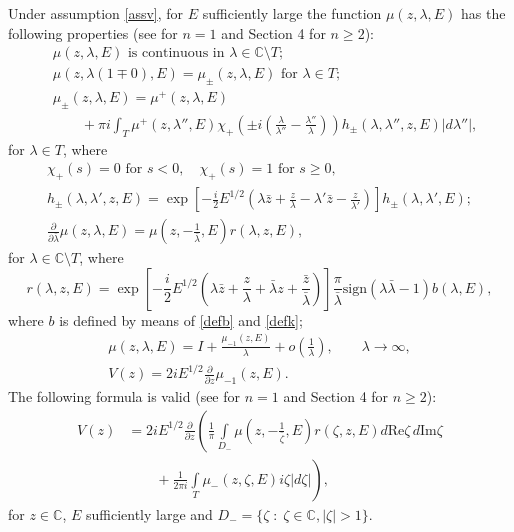 \documentclass[11pt,a4paper,english,subeqn]{amsart}
\theoremstyle{plain}
\theoremstyle{definition}
\numberwithin{equation}{section}
\begin{document}
Under assumption \eqref{assv}, for $E$ sufficiently large the function $\mu(z,\lambda, E)$ has the following properties (see \cite{N3, N4} for $n=1$ and Section 4 for $n \geq 2$):
\begin{align} \label{propmu0}
&\mu(z,\lambda,E) \text{ is continuous in } \lambda \in {\mathbb{C}} \setminus T; \\ \label{propmu1}
&\mu(z,\lambda(1\mp 0), E) = \mu_{\pm}(z,\lambda,E) \text{ for } \lambda \in T; \\ \label{mupm}
&\mu_{\pm}(z,\lambda,E) = \mu^+(z,\lambda,E) \\ \nonumber
&\qquad + \pi i \int_T \mu^+(z,\lambda'',E)  \chi_+ \left(\pm i \left(\frac{\lambda}{\lambda''} - \frac{\lambda''}{\lambda} \right) \right) h_{\pm}(\lambda, \lambda'',z,E)   |d\lambda''|,
\end{align}
for $\lambda \in T$, where 
\begin{gather} \label{defchi}
\chi_+(s) = 0 \text{ for } s < 0, \quad  \chi_+(s) = 1 \text{ for } s \geq 0, \\ \label{defhhh}
h_{\pm}(\lambda,\lambda',z,E) = \exp\left[ -\frac i 2 E^{1/2} \left( \lambda \bar z + \frac{z}{\lambda} - \lambda' \bar z - \frac{z}{\lambda'} \right) \right] h_{\pm}(\lambda, \lambda',E); \\ \label{eqdbar}
\frac{\partial}{\partial \bar \lambda}\mu(z,\lambda,E) = \mu \left(z, - \frac{1}{\bar \lambda},E\right) r(\lambda,z,E),
\end{gather}
for $\lambda \in {\mathbb{C}} \setminus T$, where
\begin{equation} \label{defr}
r(\lambda, z, E)= \exp \left[ - \frac i 2 E^{1/2}\left( \lambda \bar z + \frac{z}{\lambda} + \bar \lambda z + \frac{\bar z}{\bar \lambda} \right) \right] \frac{\pi}{\bar \lambda} \mathrm{sign}(\lambda \bar \lambda -1) b(\lambda,E),
\end{equation}
where $b$ is defined by means of \eqref{defb} and \eqref{defk};
\begin{gather} \label{devmu}
\mu(z,\lambda,E) = I + \frac{\mu_{-1}(z,E)}{\lambda} + o\left( \frac{1}{\lambda} \right), \qquad \lambda \to \infty,\\ \label{formv2}
V(z)= 2iE^{1/2}\frac{\partial}{\partial z}\mu_{-1}(z,E).
\end{gather}
The following formula is valid (see \cite{N4} for $n=1$ and Section 4 for $n \geq 2$):
\begin{align} \label{formv}
V(z)&=2iE^{1/2} \frac{\partial}{\partial z}\left( \frac{1}{\pi} \int\limits_{D_-}\mu(z,-\frac{1}{\bar \zeta},E) r(\zeta,z,E)d {\mathrm{Re}} \zeta \, d {\mathrm{Im}} \zeta\right. \\ \nonumber
&\qquad +\frac{1}{2 \pi i} \left. \int\limits_T \mu_-(z,\zeta,E) i \zeta |d \zeta| \right), 
\end{align}
for $z \in {\mathbb{C}}$, $E$ sufficiently large and $D_- = \{ \zeta \; : \; \zeta \in {\mathbb{C}}, |\zeta | > 1 \}$.
\end{document}
